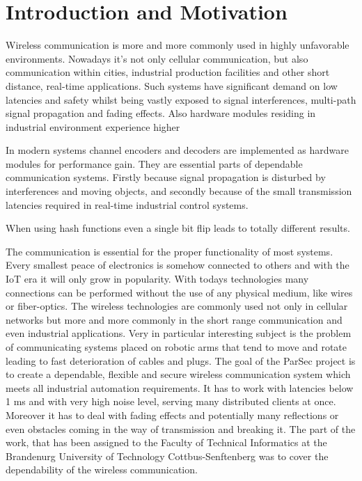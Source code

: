 \chapter{Introduction and Motivation} \label{ch:int}

Wireless communication is more and more commonly used in highly unfavorable environments. Nowadays it's not only cellular communication, but also communication within cities, industrial production facilities and other short distance, real-time applications. Such systems have significant demand on low latencies and safety whilst being vastly exposed to signal interferences, multi-path signal propagation and fading effects. Also hardware modules residing in industrial environment experience higher 

In modern systems channel encoders and decoders are implemented as hardware modules for performance gain. They are essential parts of dependable communication systems. Firstly because signal propagation is disturbed by interferences and moving objects, and secondly because of the small transmission latencies required in real-time industrial control systems.

When using hash functions even a single bit flip leads to totally different results.

The communication is essential for the proper functionality of most systems. Every smallest peace of electronics is somehow connected to others and with the IoT era it will only grow in popularity. With todays technologies many connections can be performed without the use of any physical medium, like wires or fiber-optics. The wireless technologies are commonly used not only in cellular networks but more and more commonly in the short range communication and even industrial applications. Very in particular interesting subject is the problem of communicating systems placed on robotic arms that tend to move and rotate leading to fast deterioration of cables and plugs.
The goal of the ParSec project is to create a dependable, flexible and secure wireless communication system which meets all industrial automation requirements. It has to work with latencies below 1 ms and with very high noise level, serving many distributed clients at once. Moreover it has to deal with fading effects and potentially many reflections or even obstacles coming in the way of transmission and breaking it. The part of the work, that has been assigned to the Faculty of Technical Informatics at the Brandenurg University of Technology Cottbus-Senftenberg was to cover the dependability of the wireless communication. 
